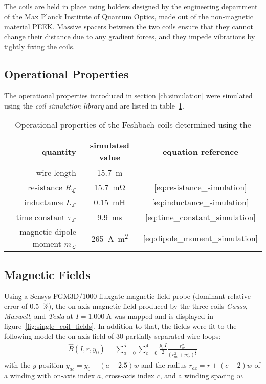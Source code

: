 The coils are held in place using holders designed by the engineering department of the Max Planck Institute of Quantum Optics, made out of the non-magnetic material PEEK. Massive spacers between the two coils ensure that they cannot change their distance due to any gradient forces, and they impede vibrations by tightly fixing the coils.

\subsection*{Operational Properties}
The operational properties introduced in section \ref{ch:simulation} were simulated using the \textit{coil simulation library} and are listed in table~\ref{tab:operational_properties}.


\begin{table}
    \centering
    \begin{tabular}{rcc}
        \toprule
        \textbf{quantity} & \textbf{simulated value}  & \textbf{equation reference} \\
        \toprule
        wire length & \SI{15.7}{\meter} & \\
        resistance $R_\mathcal{L}$ & \SI{15.7}{\milli\ohm} & \eqref {eq:resistance_simulation} \\
        inductance $L_\mathcal{L}$ & \SI{0.15}{\milli\henry} & \eqref{eq:inductance_simulation} \\ 
        time constant $\tau_\mathcal{L}$ & \SI{9.9}{\milli\second} & \eqref{eq:time_constant_simulation}\\
        magnetic dipole moment $m_\mathcal{L}$ & \SI{265}{\ampere\square\meter} & \eqref{eq:dipole_moment_simulation} \\
        \bottomrule
    \end{tabular}
    \caption{Operational properties of the Feshbach coils determined using the }
    \label{tab:operational_properties}
\end{table}


\subsection*{Magnetic Fields}
Using a Sensys FGM3D/1000 fluxgate magnetic field probe (dominant relative error of \SI{0.5}{\percent}), the on-axis magnetic field produced by the three coils \textit{Gauss}, \textit{Maxwell}, and \textit{Tesla} at $I = \SI{1.000}{\ampere}$ was mapped and is displayed in figure~\ref{fig:single_coil_fields}. In addition to that, the fields were fit to the following model the on-axis field of \SI{30}{} partially separated wire loops:
\begin{align}\label{eq:on_axis_field_model}
    \hat B(I, r, y_0) = \sum\limits_{a = 0}^5 \sum\limits_{c = 0}^4 \frac{\mu_0 I}{2} \frac{r_{ac}^2}{\left(r_{ac}^2 + y_{ac}^2\right)^\frac{3}{2}}
\end{align}
with the $y$ position $y_{ac} = y_0 + (a - 2.5) w$ and the radius $r_{ac} = r + (c-2)w$ of a winding with on-axis index $a$, cross-axis index $c$, and a winding spacing $w$.

